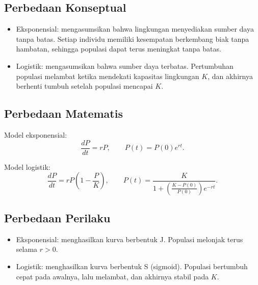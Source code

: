 \documentclass{bukumjh}
\begin{document}
\subsection*{Perbedaan Konseptual}

\begin{itemize}
    \item {\jsg Eksponensial:} mengasumsikan bahwa lingkungan menyediakan sumber daya tanpa batas. Setiap individu memiliki kesempatan berkembang biak tanpa hambatan, sehingga populasi dapat terus meningkat tanpa batas.
    \item {\jsg Logistik:} mengasumsikan bahwa sumber daya terbatas. Pertumbuhan populasi melambat ketika mendekati kapasitas lingkungan $K$, dan akhirnya berhenti tumbuh setelah populasi mencapai $K$.
\end{itemize}

\subsection*{Perbedaan Matematis}

Model eksponensial:
\[
\frac{dP}{dt} = rP, \qquad P(t) = P(0)e^{rt}.
\]

Model logistik:
\[
\frac{dP}{dt} = rP\left(1-\frac{P}{K}\right), \qquad 
P(t) = \frac{K}{1 + \left(\frac{K-P(0)}{P(0)}\right)e^{-rt}}.
\]

\subsection*{Perbedaan Perilaku}

\begin{itemize}
    \item {\jsg Eksponensial:} menghasilkan kurva berbentuk J. Populasi melonjak terus selama $r > 0$.
    \item {\jsg Logistik:} menghasilkan kurva berbentuk S (sigmoid). Populasi bertumbuh cepat pada awalnya, lalu melambat, dan akhirnya stabil pada $K$.
\end{itemize}

\begin{center}
\end{center}
\end{document}
